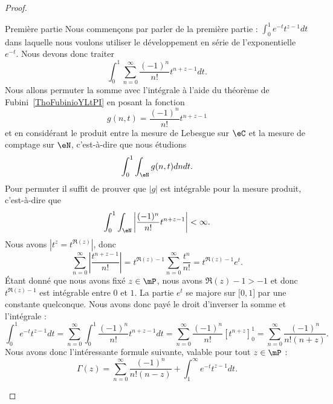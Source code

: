\begin{proof}
\begin{subproof}
        \item[Première partie] Nous commençons par parler de la première partie : \( \int_0^1 e^{-t}t^{z-1}dt\) dans laquelle nous voulons utiliser le développement en série de l'exponentielle \(  e^{-t}\). Nous devons donc traiter
            \begin{equation}
                \int_0^1\sum_{n=0}^{\infty}\frac{ (-1)^n }{ n! }t^{n+z-1}dt.
            \end{equation}
            Nous allons permuter la somme avec l'intégrale à l'aide du théorème de Fubini~\ref{ThoFubinioYLtPI} en posant la fonction
            \begin{equation}
                g(n,t)=\frac{ (-1)^n }{ n! }t^{n+z-1}
            \end{equation}
            et en considérant le produit entre la mesure de Lebesgue sur \( \eC\) et la mesure de comptage sur \( \eN\), c'est-à-dire que nous étudions
            \begin{equation}
                \int_0^1\int_{\eN}g(n,t)dndt.
            \end{equation}
            Pour permuter il suffit de prouver que \( | g |\) est intégrable pour la mesure produit, c'est-à-dire que
            \begin{equation}
                \int_0^1\int_{\eN}\left| \frac{ (-1)^n }{ n! }t^{n+z-1} \right| <\infty.
            \end{equation}
            Nous avons \( | t^z=t^{\Re(z)} |\), donc
            \begin{equation}
                \sum_{n=0}^{\infty}\left| \frac{ t^{n+z-1} }{ n! } \right| =t^{\Re(z)-1}\sum_{n=0}^{\infty}\frac{ t^n }{ n! }=t^{\Re(z)-1} e^{t}.
            \end{equation}
            Étant donné que nous avons fixé \( z\in\mP\), nous avons \( \Re(z)-1>-1\) et donc \( t^{\Re(z)-1}\) est intégrable entre \( 0\) et \( 1\).
            La partie \(  e^{t}\) se majore sur \( \mathopen[ 0 , 1 \mathclose]\) par une constante quelconque. Nous avons donc payé le droit d'inverser la somme et l'intégrale :
            \begin{equation}
                \int_0^1 e^{-t}t^{z-1}dt=\sum_{n=0}^{\infty}\int_0^1\frac{ (-1)^n }{ n! }t^{n+z-1}dt=\sum_{n=0}^{\infty}\frac{ (-1)^n }{ n! }[t^{n+z}]_0^1=\sum_{n=0}^{\infty}\frac{ (-1)^n }{ n!(n+z) }.
            \end{equation}
            Nous avons donc l'intéressante formule suivante, valable pour tout \( z\in\mP\) :
            \begin{equation}
                \Gamma(z)=\sum_{n=0}^{\infty}\frac{ (-1)^n }{ n!(n-z) }+\int_1^{\infty} e^{-t}t^{z-1}dt.
            \end{equation}


\end{subproof}
\end{proof}
